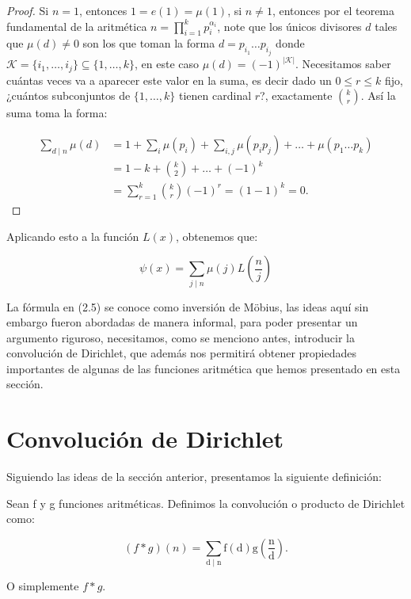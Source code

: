 \begin{proof}

Si $n=1$, entonces $1=e(1)=\mu(1)$, si $n\neq 1$, entonces por el teorema fundamental de la aritmética $n=\displaystyle\prod_{i=1}^k p_i^{\alpha_i}$, note que los únicos divisores $d$ tales que $\mu(d)\neq 0$ son los que toman la forma $d=p_{i_1}\ldots p_{i_j}$ donde $\mathcal{K}=\{i_1,\ldots, i_j\}\subseteq \{1,\ldots,k\}$, en este caso $\mu(d)=(-1)^{|\mathcal{K}|}$. Necesitamos saber cuántas veces va a aparecer este valor en la suma, es decir dado un $0\leq r\leq k$ fijo, ¿cuántos subconjuntos de $\{1,\ldots,k\}$ tienen cardinal $r$?, exactamente $\displaystyle \binom{k}{r}$. Así la suma toma la forma:

\begin{align*}
    \sum_{d\mid n}\mu(d)&=1+\sum_{i}\mu(p_i)+\sum_{i,j}\mu(p_ip_j)+\ldots+\mu(p_1\ldots p_k)\\
    &=1-k+\binom{k}{2}+\ldots+(-1)^k\\
    &=\sum_{r=1}^k\binom{k}{r}(-1)^r=(1-1)^k=0
.\end{align*}

\end{proof}

Aplicando esto a la función $L(x)$, obtenemos que:

$$\psi(x)=\sum_{j\mid n} \mu(j)L \left( \frac{n}{j} \right)$$

La fórmula en (2.5) se conoce como inversión de Möbius, las ideas aquí sin embargo fueron abordadas de manera informal, para poder presentar un argumento riguroso, necesitamos, como se menciono antes, introducir la convolución de Dirichlet, que además nos permitirá obtener propiedades importantes de algunas de las funciones aritmética que hemos presentado en esta sección.

\section{Convolución de Dirichlet}

Siguiendo las ideas de la  sección anterior, presentamos la siguiente definición:
\pagebreak

\begin{definition}
Sean f y g funciones aritméticas. Definimos la convolución o producto de Dirichlet como: 

$$(f*g)(n)=\sum_{\mathrm{d} \mid \mathrm{n}} \mathrm{f}(\mathrm{d}) \mathrm{g}\left(\frac{\mathrm{n}}{\mathrm{d}}\right).$$

O simplemente $f*g$.
\end{definition}

